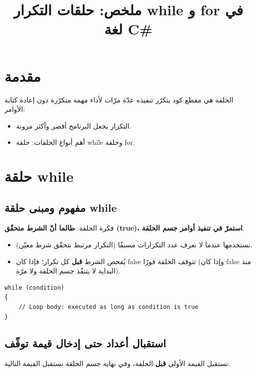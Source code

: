 \documentclass[14pt]{extarticle}
\title{ملخص: حلقات التكرار \textenglish{while} و \textenglish{for} في لغة \textenglish{C\#}}
\begin{document}
\maketitle
\thispagestyle{fancy}

\section*{مقدمة}
الحلقة هي مقطع كود يتكرّر تنفيذه عدّة مرّات لأداء مهمة متكرّرة دون إعادة كتابة الأوامر:
\begin{itemize}[nosep]
    \item التكرار يجعل البرنامج أقصر وأكثر مرونة.
    \item أهم أنواع الحلقات: حلقة \textenglish{while} وحلقة \textenglish{for}.
\end{itemize}

\section{حلقة \textenglish{while}}

\subsection{مفهوم ومبنى حلقة \textenglish{while}}
فكرة الحلقة: \textbf{طالما أنّ الشرط متحقّق (\textenglish{true})، استمرّ في تنفيذ أوامر جسم الحلقة}.
\begin{itemize}[nosep]
    \item نستخدمها عندما لا نعرف عدد التكرارات مسبقًا (التكرار مرتبط بتحقّق شرط معيّن).
    \item يُفحص الشرط \textbf{قبل} كل تكرار؛ فإذا كان \textenglish{false} تتوقف الحلقة فورًا (وإذا كان \textenglish{false} منذ البداية لا يتنفّذ جسم الحلقة ولا مرّة).
\end{itemize}

\begin{boxCode}
\begin{english}
\begin{verbatim}
while (condition)
{
    // Loop body: executed as long as condition is true
}
\end{verbatim}
\end{english}
\end{boxCode}

\filbreak
\subsection{استقبال أعداد حتى إدخال قيمة توقّف}
نستقبل القيمة الأولى \textbf{قبل} الحلقة، وفي نهاية جسم الحلقة نستقبل القيمة التالية:
\end{document}

